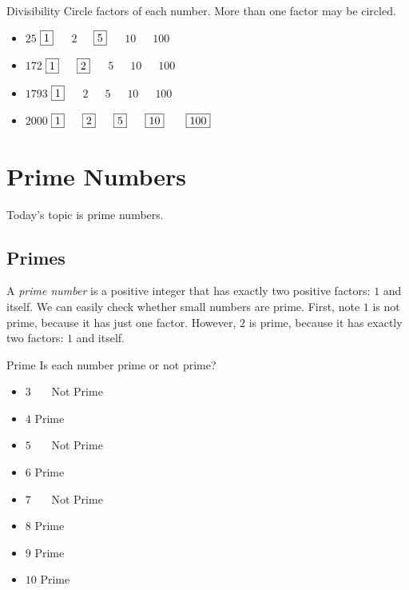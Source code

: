 \documentclass[a4paper,10pt]{report}
\begin{document}
\begin{problem}{Divisibility}
 Circle factors of each number. More than one factor may be circled.

 \begin{itemize}
  \item $25$ \hfill $\Ans{1}$~~~$2$~~~$\Ans{5}$~~~$10$~~~$100$
  \item $172$ \hfill $\Ans{1}$~~~$\Ans{2}$~~~$5$~~~$10$~~~$100$
  \item $1793$ \hfill $\Ans{1}$~~~$2$~~~$5$~~~$10$~~~$100$
  \item $2000$ \hfill $\Ans{1}$~~~$\Ans{2}$~~~$\Ans{5}$~~~$\Ans{10}$
  ~~~$\Ans{100}$
 \end{itemize}
\end{problem}

\chapter{Prime Numbers}

Today's topic is prime numbers.

\section{Primes}
A \emph{prime number} is a positive integer that has exactly two positive
factors: $1$ and itself. We can easily check whether small numbers are prime.
First, note $1$ is not prime, because it has just one factor. However, $2$ is
prime, because it has exactly two factors: $1$ and itself.

\begin{problem}{Prime}
 Is each number prime or not prime?

 \begin{itemize}
  \item $3$ \hfill {}~~~Not Prime
  \item $4$ \hfill Prime~~~
  \item $5$ \hfill {}~~~Not Prime
  \item $6$ \hfill Prime~~~
  \item $7$ \hfill {}~~~Not Prime
  \item $8$ \hfill Prime~~~
  \item $9$ \hfill Prime~~~
  \item $10$ \hfill Prime~~~
 \end{itemize}
\end{problem}
\end{document}
